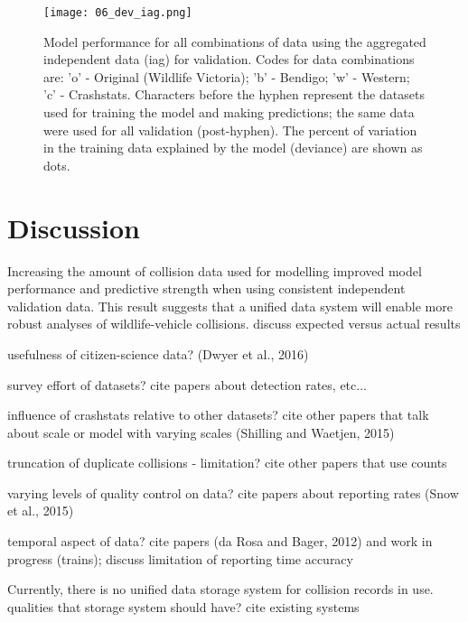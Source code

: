 \begin{figure*}[htp]
  \centering
  \texttt{[image: 06\_dev\_iag.png]}
  \caption[Model discrimination ability for all combinations of training data using the aggregated independent data for validation]{Model performance for all combinations of data using the aggregated independent data (iag) for validation. Codes for data combinations are: 'o' - Original (Wildlife Victoria); 'b' - Bendigo; 'w' - Western; 'c' - Crashstats. Characters before the hyphen represent the datasets used for training the model and making predictions; the same data were used for all validation (post-hyphen). The percent of variation in the training data explained by the model (deviance) are shown as dots.}
  \label{val_calib_dev}
\end{figure*}

\section{Discussion}

Increasing the amount of collision data used for modelling improved model performance and predictive strength when using consistent independent validation data. This result suggests that a unified data system will enable more robust analyses of wildlife-vehicle collisions. discuss expected versus actual results

usefulness of citizen-science data? (Dwyer et al., 2016)

survey effort of datasets? cite papers about detection rates, etc...

influence of crashstats relative to other datasets? cite other papers that talk about scale or model with varying scales (Shilling and Waetjen, 2015)

truncation of duplicate collisions - limitation? cite other papers that use counts

varying levels of quality control on data? cite papers about reporting rates (Snow et al., 2015)

temporal aspect of data? cite papers (da Rosa and Bager, 2012) and work in progress (trains); discuss limitation of reporting time accuracy

Currently, there is no unified data storage system for collision records in use. qualities that storage system should have? cite existing systems